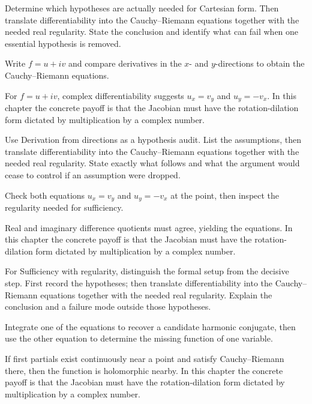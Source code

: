 \begin{exercise}\label{exr:iv02-01}
Determine which hypotheses are actually needed for Cartesian form. Then translate differentiability into the Cauchy--Riemann equations together with the needed real regularity. State the conclusion and identify what can fail when one essential hypothesis is removed.
\end{exercise}
\begin{hint}
Write \(f=u+iv\) and compare derivatives in the \(x\)- and \(y\)-directions to obtain the Cauchy--Riemann equations.
\end{hint}
\begin{solution}
For $f=u+iv$, complex differentiability suggests $u_x=v_y$ and $u_y=-v_x$. In this chapter the concrete payoff is that the Jacobian must have the rotation-dilation form dictated by multiplication by a complex number.
\end{solution}

\begin{exercise}\label{exr:iv02-02}
Use Derivation from directions as a hypothesis audit. List the assumptions, then translate differentiability into the Cauchy--Riemann equations together with the needed real regularity. State exactly what follows and what the argument would cease to control if an assumption were dropped.
\end{exercise}
\begin{hint}
Check both equations \(u_x=v_y\) and \(u_y=-v_x\) at the point, then inspect the regularity needed for sufficiency.
\end{hint}
\begin{solution}
Real and imaginary difference quotients must agree, yielding the equations. In this chapter the concrete payoff is that the Jacobian must have the rotation-dilation form dictated by multiplication by a complex number.
\end{solution}

\begin{exercise}\label{exr:iv02-03}
For Sufficiency with regularity, distinguish the formal setup from the decisive step. First record the hypotheses; then translate differentiability into the Cauchy--Riemann equations together with the needed real regularity. Explain the conclusion and a failure mode outside those hypotheses.
\end{exercise}
\begin{hint}
Integrate one of the equations to recover a candidate harmonic conjugate, then use the other equation to determine the missing function of one variable.
\end{hint}
\begin{solution}
If first partials exist continuously near a point and satisfy Cauchy–Riemann there, then the function is holomorphic nearby. In this chapter the concrete payoff is that the Jacobian must have the rotation-dilation form dictated by multiplication by a complex number.
\end{solution}

